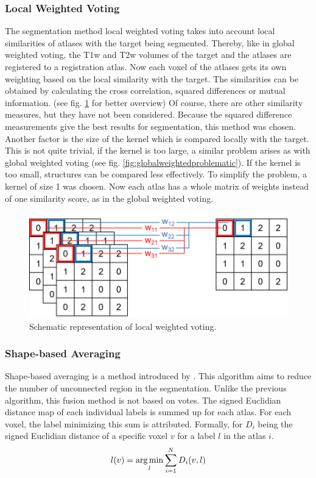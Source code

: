 \subsubsection*{Local Weighted Voting}
The segmentation method local weighted voting takes into account local similarities of atlases with the target being segmented. Thereby, like in global weighted voting, the T1w and T2w volumes of the target and the atlases are registered to a registration atlas. Now each voxel of the atlases gets its own weighting based on the local similarity with the target. The similarities can be obtained by calculating the cross correlation, squared differences or mutual information. (see fig. \ref{fig:localWeightedVoting} for better overview) Of course, there are other similarity measures, but they have not been considered. Because the squared difference measurements give the best results for segmentation, this method was chosen\cite{b2}. Another factor is the size of the kernel which is compared locally with the target. This is not quite trivial, if the kernel is too large, a similar problem arises as with global weighted voting (see fig. \ref{fig:globalweightedproblematic}). If the kernel is too small, structures can be compared less effectively. To simplify the problem, a kernel of size 1 was chosen. Now each atlas has a whole matrix of weights instead of one similarity score, as in the global weighted voting.

\begin{figure}[h!]
	\centering
	\includegraphics[width=0.8\linewidth]{img/localWeighting}
	\caption{Schematic representation of local weighted voting.}
	\label{fig:localWeightedVoting}
\end{figure}

\subsubsection*{Shape-based Averaging}
Shape-based averaging is a method introduced by \cite{Rohlfing2007}. This algorithm aims to reduce the number of unconnected region in the segmentation. Unlike the previous algorithm, this fusion method is not based on votes. The signed Euclidian distance map of each individual labels is summed up for each atlas. For each voxel, the label minimizing this sum is attributed. Formally, for $D_i$ being the signed Euclidian distance of a specific voxel $v$ for a label $l$ in the atlas $i$.
\[ l(v) = \operatorname*{arg\,min}_l\sum_{i=1}^{N} D_i(v, l) \]

